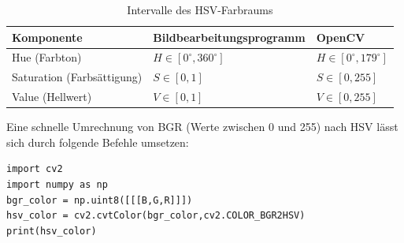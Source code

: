 \documentclass[a4paper, 12pt]{scrartcl}
\begin{document}
\begin{table}[H]
	\centering
	\begin{tabular}{l|l|l}
		Komponente & Bildbearbeitungsprogramm & OpenCV
		\\
		\hline
		Hue (Farbton) & $H\in\left[0^\circ, 360^\circ\right]$ & $H\in\left[0^\circ,179^\circ\right]$
		\\
		Saturation (Farbsättigung) & $S\in\left[0, 1\right]$ & $S\in\left[0, 255\right]$
		\\
		Value (Hellwert) & $V\in\left[0, 1\right]$ & $V\in\left[0, 255\right]$
	\end{tabular} 
	\caption{Intervalle des HSV-Farbraums}
	\label{hsv}
\end{table}

Eine schnelle Umrechnung von BGR (Werte zwischen 0 und 255) nach HSV lässt sich durch folgende Befehle umsetzen:

\begin{lstlisting}
import cv2
import numpy as np
bgr_color = np.uint8([[[B,G,R]]])
hsv_color = cv2.cvtColor(bgr_color,cv2.COLOR_BGR2HSV)
print(hsv_color)
\end{lstlisting}
\end{document}

